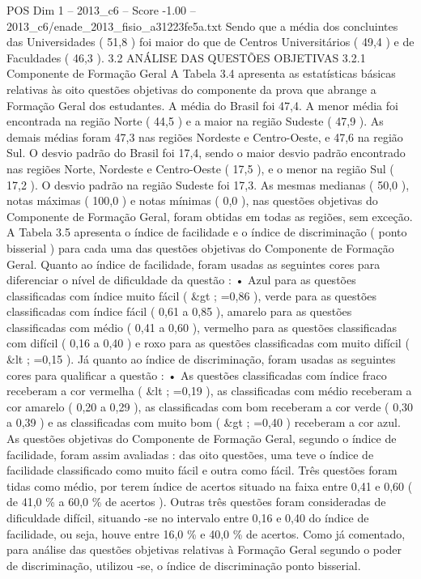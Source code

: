 \begin{textsample}{POS Dim 1 – 2013\_c6 – Score -1.00 – 2013\_c6/enade\_2013\_fisio\_a31223fe5a.txt}
Sendo que a média dos concluintes das Universidades ( 51,8 ) foi maior do que de Centros Universitários ( 49,4 ) e de Faculdades ( 46,3 ). 3.2 ANÁLISE DAS QUESTÕES OBJETIVAS 3.2.1 Componente de Formação Geral A Tabela 3.4 apresenta as estatísticas básicas relativas às oito questões objetivas do componente da prova que abrange a Formação Geral dos estudantes.
A média do Brasil foi 47,4.
A menor média foi encontrada na região Norte ( 44,5 ) e a maior na região Sudeste ( 47,9 ).
As demais médias foram 47,3 nas regiões Nordeste e Centro-Oeste, e 47,6 na região Sul.
O desvio padrão do Brasil foi 17,4, sendo o maior desvio padrão encontrado nas regiões Norte, Nordeste e Centro-Oeste ( 17,5 ), e o menor na região Sul ( 17,2 ).
O desvio padrão na região Sudeste foi 17,3.
As mesmas medianas ( 50,0 ), notas máximas ( 100,0 ) e notas mínimas ( 0,0 ), nas questões objetivas do Componente de Formação Geral, foram obtidas em todas as regiões, sem exceção.
A Tabela 3.5 apresenta o índice de facilidade e o índice de discriminação ( ponto bisserial ) para cada uma das questões objetivas do Componente de Formação Geral.
Quanto ao índice de facilidade, foram usadas as seguintes cores para diferenciar o nível de dificuldade da questão : • Azul para as questões classificadas com índice muito fácil ( \&gt ; =0,86 ), verde para as questões classificadas com índice fácil ( 0,61 a 0,85 ), amarelo para as questões classificadas com médio ( 0,41 a 0,60 ), vermelho para as questões classificadas com difícil ( 0,16 a 0,40 ) e roxo para as questões classificadas com muito difícil ( \&lt ; =0,15 ).
Já quanto ao índice de discriminação, foram usadas as seguintes cores para qualificar a questão : • As questões classificadas com índice fraco receberam a cor vermelha ( \&lt ; =0,19 ), as classificadas com médio receberam a cor amarelo ( 0,20 a 0,29 ), as classificadas com bom receberam a cor verde ( 0,30 a 0,39 ) e as classificadas com muito bom ( \&gt ; =0,40 ) receberam a cor azul.
As questões objetivas do Componente de Formação Geral, segundo o índice de facilidade, foram assim avaliadas : das oito questões, uma teve o índice de facilidade classificado como muito fácil e outra como fácil.
Três questões foram tidas como médio, por terem índice de acertos situado na faixa entre 0,41 e 0,60 ( de 41,0 \% a 60,0 \% de acertos ).
Outras três questões foram consideradas de dificuldade difícil, situando -se no intervalo entre 0,16 e 0,40 do índice de facilidade, ou seja, houve entre 16,0 \% e 40,0 \% de acertos.
Como já comentado, para análise das questões objetivas relativas à Formação Geral segundo o poder de discriminação, utilizou -se, o índice de discriminação ponto bisserial.

\end{textsample}
